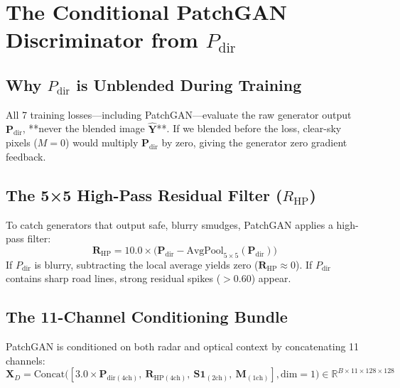 \documentclass[11pt,a4paper]{article}
\begin{document}
\section{The Conditional PatchGAN Discriminator from $P_{\text{dir}}$}

\subsection{Why $P_{\text{dir}}$ is Unblended During Training}
All 7 training losses—including PatchGAN—evaluate the raw generator output $\mathbf{P}_{\text{dir}}$, **never the blended image $\hat{\mathbf{Y}}$**. If we blended before the loss, clear-sky pixels ($M=0$) would multiply $\mathbf{P}_{\text{dir}}$ by zero, giving the generator zero gradient feedback.

\subsection{The 5×5 High-Pass Residual Filter ($R_{\text{HP}}$)}
To catch generators that output safe, blurry smudges, PatchGAN applies a high-pass filter:
\begin{equation}
\mathbf{R}_{\text{HP}} = 10.0 \times \Big( \mathbf{P}_{\text{dir}} - \text{AvgPool}_{5\times 5}(\mathbf{P}_{\text{dir}}) \Big)
\end{equation}
If $P_{\text{dir}}$ is blurry, subtracting the local average yields zero ($\mathbf{R}_{\text{HP}} \approx 0$). If $P_{\text{dir}}$ contains sharp road lines, strong residual spikes ($>0.60$) appear.

\subsection{The 11-Channel Conditioning Bundle}
PatchGAN is conditioned on both radar and optical context by concatenating 11 channels:
\begin{equation}
\mathbf{X}_D = \text{Concat}\big( [3.0 \times \mathbf{P}_{\text{dir}(4\text{ch})},\ \mathbf{R}_{\text{HP}(4\text{ch})},\ \mathbf{S1}_{(2\text{ch})},\ \mathbf{M}_{(1\text{ch})}], \text{dim}=1 \big) \in \mathbb{R}^{B \times 11 \times 128 \times 128}
\end{equation}
\end{document}
